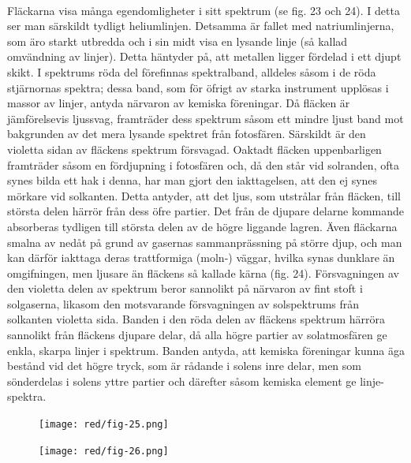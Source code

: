 \documentclass[a4paper, 12pt, oneside, swedish]{article}
\begin{document}
\paragraph{}
Fläckarna visa många egendomligheter i sitt spektrum (se fig. 23 och 24). I detta ser man särskildt tydligt heliumlinjen. Detsamma är fallet med natriumlinjerna, som äro starkt utbredda och i sin midt visa en lysande linje (så kallad omvändning av linjer). Detta häntyder på, att metallen ligger fördelad i ett djupt skikt. I spektrums röda del förefinnas spektralband, alldeles såsom i de röda stjärnornas spektra; dessa band, som för öfrigt av starka instrument upplösas i massor av linjer, antyda närvaron av kemiska föreningar. Då fläcken är jämförelsevis ljussvag, framträder dess spektrum såsom ett mindre ljust band mot bakgrunden av det mera lysande spektret från fotosfären. Särskildt är den violetta sidan av fläckens spektrum försvagad. Oaktadt fläcken uppenbarligen framträder såsom en fördjupning i fotosfären och, då den står vid solranden, ofta synes bilda ett hak i denna, har man gjort den iakttagelsen, att den ej synes mörkare vid solkanten. Detta antyder, att det ljus, som utstrålar från fläcken, till största delen härrör från dess öfre partier. Det från de djupare delarne kommande absorberas tydligen till största delen av de högre liggande lagren. Även fläckarna smalna av nedåt på grund av gasernas sammanprässning på större djup, och man kan därför iakttaga deras trattformiga (moln-) väggar, hvilka synas dunklare än omgifningen, men ljusare än fläckens så kallade kärna (fig. 24). Försvagningen av den violetta delen av spektrum beror sannolikt på närvaron av fint stoft i solgaserna, likasom den motsvarande försvagningen av solspektrums från solkanten violetta sida. Banden i den röda delen av fläckens spektrum härröra sannolikt från fläckens djupare delar, då alla högre partier av solatmosfären ge enkla, skarpa linjer i spektrum. Banden antyda, att kemiska föreningar kunna äga bestånd vid det högre tryck, som är rådande i solens inre delar, men som sönderdelas i solens yttre partier och därefter såsom kemiska element ge linje-spektra.

\begin{figure}[H]
\centering
\texttt{[image: red/fig-25.png]}
\caption{}
\end{figure}

\begin{figure}[H]
\centering
\texttt{[image: red/fig-26.png]}
\caption{}
\end{figure}
\end{document}
